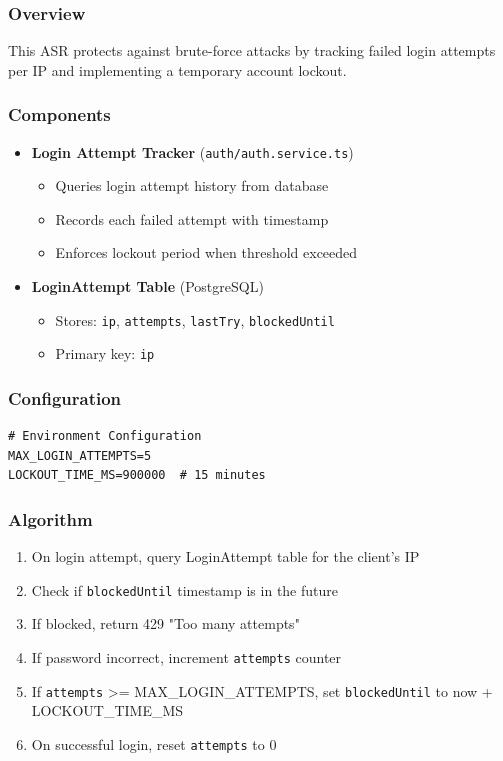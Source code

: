 \documentclass[12pt,oneside,a4paper]{article}
\begin{document}
\subsubsection{Overview}
This ASR protects against brute-force attacks by tracking failed login attempts per IP and implementing a temporary account lockout.

\subsubsection{Components}
\begin{itemize}
    \item \textbf{Login Attempt Tracker} (\texttt{auth/auth.service.ts})
        \begin{itemize}
            \item Queries login attempt history from database
            \item Records each failed attempt with timestamp
            \item Enforces lockout period when threshold exceeded
        \end{itemize}
    \item \textbf{LoginAttempt Table} (PostgreSQL)
        \begin{itemize}
            \item Stores: \texttt{ip}, \texttt{attempts}, \texttt{lastTry}, \texttt{blockedUntil}
            \item Primary key: \texttt{ip}
        \end{itemize}
\end{itemize}

\subsubsection{Configuration}
\begin{lstlisting}
# Environment Configuration
MAX_LOGIN_ATTEMPTS=5
LOCKOUT_TIME_MS=900000  # 15 minutes
\end{lstlisting}

\subsubsection{Algorithm}
\begin{enumerate}
    \item On login attempt, query LoginAttempt table for the client's IP
    \item Check if \texttt{blockedUntil} timestamp is in the future
    \item If blocked, return 429 "Too many attempts"
    \item If password incorrect, increment \texttt{attempts} counter
    \item If \texttt{attempts} >= MAX\_LOGIN\_ATTEMPTS, set \texttt{blockedUntil} to now + LOCKOUT\_TIME\_MS
    \item On successful login, reset \texttt{attempts} to 0
\end{enumerate}
\end{document}
